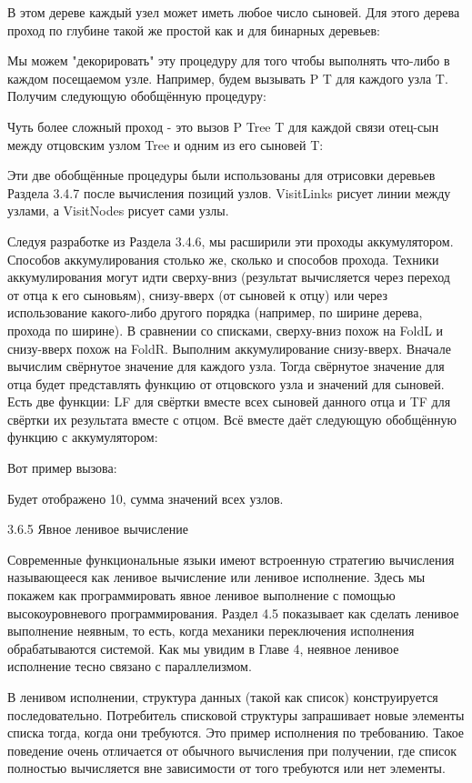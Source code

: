 В этом дереве каждый узел может иметь любое число сыновей. Для этого дерева проход по глубине такой же простой как и для бинарных деревьев:

Мы можем "декорировать" эту процедуру для того чтобы выполнять что-либо в каждом посещаемом узле. Например, будем вызывать {P T} для каждого узла T. Получим следующую обобщённую процедуру:

Чуть более сложный проход - это вызов {P Tree T} для каждой связи отец-сын между отцовским узлом Tree и одним из его сыновей T:

Эти две обобщённые процедуры были использованы для отрисовки деревьев Раздела 3.4.7 после вычисления позиций узлов. VisitLinks рисует линии между узлами, а VisitNodes рисует сами узлы.

Следуя разработке из Раздела 3.4.6, мы расширили эти проходы аккумулятором. Способов аккумулирования столько же, сколько и способов прохода. Техники аккумулирования могут идти сверху-вниз (результат вычисляется через переход от отца к его сыновьям), снизу-вверх (от сыновей к отцу) или через использование какого-либо другого порядка (например, по ширине дерева, прохода по ширине). В сравнении со списками, сверху-вниз похож на FoldL и снизу-вверх похож на FoldR. Выполним аккумулирование снизу-вверх. Вначале вычислим свёрнутое значение для каждого узла. Тогда свёрнутое значение для отца будет представлять функцию от отцовского узла и значений для сыновей. Есть две функции: LF для свёртки вместе всех сыновей данного отца и TF для свёртки их результата вместе с отцом. Всё вместе даёт следующую обобщённую функцию с аккумулятором:

Вот пример вызова:

Будет отображено 10, сумма значений всех узлов.

3.6.5 Явное ленивое вычисление

Современные функциональные языки имеют встроенную стратегию вычисления называющееся как ленивое вычисление или ленивое исполнение. Здесь мы покажем как программировать явное ленивое выполнение с помощью высокоуровневого программирования. Раздел 4.5 показывает как сделать ленивое выполнение неявным, то есть, когда механики переключения исполнения обрабатываются системой. Как мы увидим в Главе 4, неявное ленивое исполнение тесно связано с параллелизмом.

В ленивом исполнении, структура данных (такой как список) конструируется последовательно. Потребитель списковой структуры запрашивает новые элементы списка тогда, когда они требуются. Это пример исполнения по требованию. Такое поведение очень отличается от обычного вычисления при получении, где список полностью вычисляется вне зависимости от того требуются или нет элементы.

